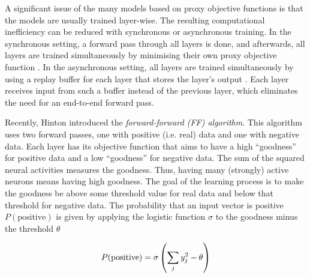 A significant issue of the many models based on proxy objective functions is that the models are usually trained layer-wise.
The resulting computational inefficiency can be reduced with synchronous or asynchronous training.
In the synchronous setting, a forward pass through all layers is done, and afterwards, all layers are trained simultaneously by minimising their own proxy objective function \cite{belilovsky2019greedy}.
In the asynchronous setting, all layers are trained simultaneously by using a replay buffer for each layer that stores the layer's output .
Each layer receives input from such a buffer instead of the previous layer, which eliminates the need for an end-to-end forward pass.

Recently, Hinton  introduced the \emph{forward-forward (FF) algorithm}.
This algorithm uses two forward passes, one with positive (i.e. real) data and one with negative data.
Each layer has its objective function that aims to have a high ``goodness'' for positive data and a low ``goodness'' for negative data. 
The sum of the squared neural activities measures the goodness. Thus, having many (strongly) active neurons means having high goodness.
The goal of the learning process is to make the goodness be above some threshold value for real data and below that threshold for negative data.
The probability that an input vector is positive $P(\text{positive}
)$ is given by applying the logistic function $\sigma$ to the goodness minus the threshold $\theta$

\begin{align}\eqlbl{ff2}
	P(\text{positive}) = \sigma \left( \sum_j y^2_j - \theta \right)
\end{align}

